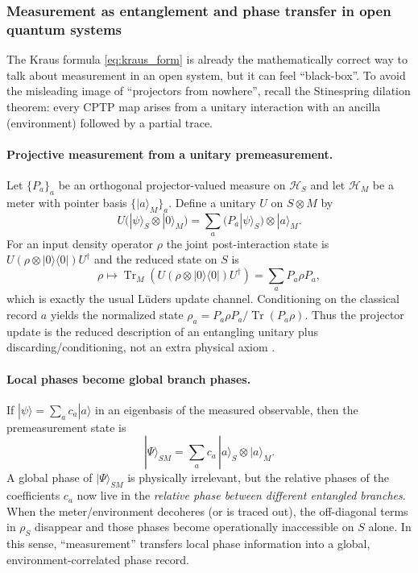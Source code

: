 \documentclass[11pt,oneside]{amsbook}
\numberwithin{equation}{section}
\theoremstyle{plain}
\theoremstyle{definition}
\theoremstyle{remark}
\DeclareMathOperator{\Tr}{\mathrm{Tr}}
\begin{document}
\subsubsection{Measurement as entanglement and phase transfer in open quantum systems}
\label{sec:measurement_as_entanglement}

The Kraus formula \eqref{eq:kraus_form} is already the mathematically correct way to talk about measurement in an open system, but it can feel ``black-box''.
To avoid the misleading image of ``projectors from nowhere'', recall the Stinespring dilation theorem: every CPTP map arises from a unitary interaction with an ancilla (environment) followed by a partial trace.

\paragraph{Projective measurement from a unitary premeasurement.}
Let $\{P_a\}_a$ be an orthogonal projector-valued measure on $\mathcal{H}_S$ and let $\mathcal{H}_M$ be a meter with pointer basis $\{|a\rangle_M\}_a$.
Define a unitary $U$ on $S\otimes M$ by
\[
U\bigl(|\psi\rangle_S\otimes|0\rangle_M\bigr)=\sum_a (P_a|\psi\rangle_S)\otimes|a\rangle_M .
\]
For an input density operator $\rho$ the joint post-interaction state is $U(\rho\otimes|0\rangle\langle0|)U^\dagger$ and the reduced state on $S$ is
\[
\rho \longmapsto \Tr_M\!\left(U(\rho\otimes|0\rangle\langle0|)U^\dagger\right)=\sum_a P_a\rho P_a,
\]
which is exactly the usual L\"{u}ders update channel.
Conditioning on the classical record $a$ yields the normalized state $\rho_a=P_a\rho P_a/\Tr(P_a\rho)$.
Thus the projector update is the reduced description of an entangling unitary plus discarding/conditioning, not an extra physical axiom \cite{NielsenChuang2000,BreuerPetruccione2002OpenSystems}.

\paragraph{Local phases become global branch phases.}
If $|\psi\rangle=\sum_a c_a |a\rangle$ in an eigenbasis of the measured observable, then the premeasurement state is
\[
|\Psi\rangle_{SM}=\sum_a c_a\,|a\rangle_S\otimes|a\rangle_M .
\]
A global phase of $|\Psi\rangle_{SM}$ is physically irrelevant, but the relative phases of the coefficients $c_a$ now live in the \emph{relative phase between different entangled branches}.
When the meter/environment decoheres (or is traced out), the off-diagonal terms in $\rho_S$ disappear and those phases become operationally inaccessible on $S$ alone.
In this sense, ``measurement'' transfers local phase information into a global, environment-correlated phase record.
\end{document}
